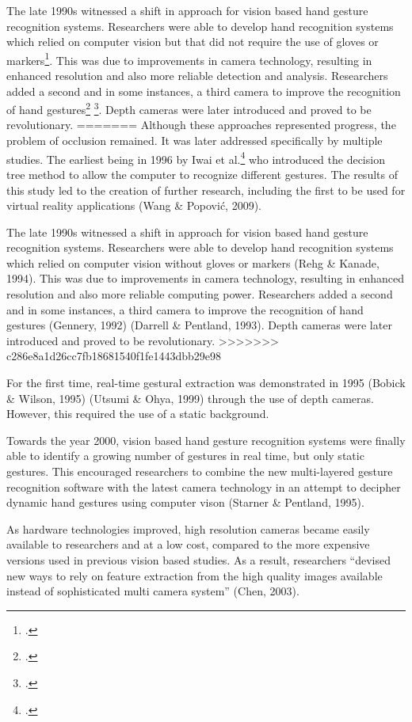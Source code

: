 The late 1990s witnessed a shift in approach for vision based hand gesture recognition systems. Researchers were able to develop hand recognition systems which relied on computer vision but that did not require the use of gloves or markers\footcite{Rehg1994}. This was due to improvements in camera technology, resulting in enhanced resolution and also more reliable detection and analysis. Researchers added a second and in some instances, a third camera to improve the recognition of hand gestures\footcite{Gennery1992} \footcite{Darrell1993}. Depth cameras were later introduced and proved to be revolutionary. 
=======
Although these approaches represented progress, the problem of occlusion remained. It was later addressed specifically by multiple studies. The earliest being in 1996 by Iwai et al.\footcite{Iwai1996} who introduced the decision tree method to allow the computer to recognize different gestures. The results of this study led to the creation of further research, including the first to be used for virtual reality applications (Wang \& Popović, 2009). 

The late 1990s witnessed a shift in approach for vision based hand gesture recognition systems. Researchers were able to develop hand recognition systems which relied on computer vision without gloves or markers (Rehg \& Kanade, 1994). This was due to improvements in camera technology, resulting in enhanced resolution and also more reliable computing power. Researchers added a second and in some instances, a third camera to improve the recognition of hand gestures (Gennery, 1992) (Darrell \& Pentland, 1993). Depth cameras were later introduced and proved to be revolutionary. 
>>>>>>> c286e8a1d26cc7fb18681540f1fe1443dbb29e98

For the first time, real-time gestural extraction was demonstrated in 1995 (Bobick \& Wilson, 1995) (Utsumi \& Ohya, 1999) through the use of depth cameras. However, this required the use of a static background.  

Towards the year 2000, vision based hand gesture recognition systems were finally able to identify a growing number of gestures in real time, but only static gestures. This encouraged researchers to combine the new multi-layered gesture recognition software with the latest camera technology in an attempt to decipher dynamic hand gestures using computer vison (Starner \& Pentland, 1995). 

As hardware technologies improved, high resolution cameras became easily available to researchers and at a low cost, compared to the more expensive versions used in previous vision based studies. As a result, researchers ``devised new ways to rely on feature extraction from the high quality images available instead of sophisticated multi camera system'' (Chen, 2003). 

